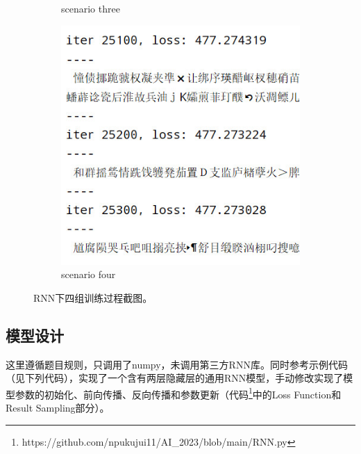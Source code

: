\documentclass[letterpaper,12pt]{article}
\begin{document}
\begin{figure}[htbp]
\begin{subfigure}{0.23\textwidth}
					\captionsetup{font=scriptsize}
					\caption{scenario three}
					\label{fig: quit_3}	
				\end{subfigure}
				\begin{subfigure}{0.23\textwidth}
					\includegraphics[width=\linewidth]{RNN/quit_4}
					\captionsetup{font=scriptsize}
					\caption{scenario four}
					\label{fig: quit_4}	
				\end{subfigure}
				\captionsetup{font=scriptsize}
				\caption{
					\label{fig: RNN_quit} %
					RNN下四组训练过程截图。
				}
			\end{figure}
	
		\subsection{模型设计}
		
		这里遵循题目规则，只调用了numpy，未调用第三方RNN库。同时参考示例代码（见下列代码），实现了一个含有两层隐藏层的通用RNN模型，手动修改实现了模型参数的初始化、前向传播、反向传播和参数更新（代码\footnote{https://github.com/npukujui11/AI\_2023/blob/main/RNN.py}中的Loss Function和Result Sampling部分）。
		
\end{document}

